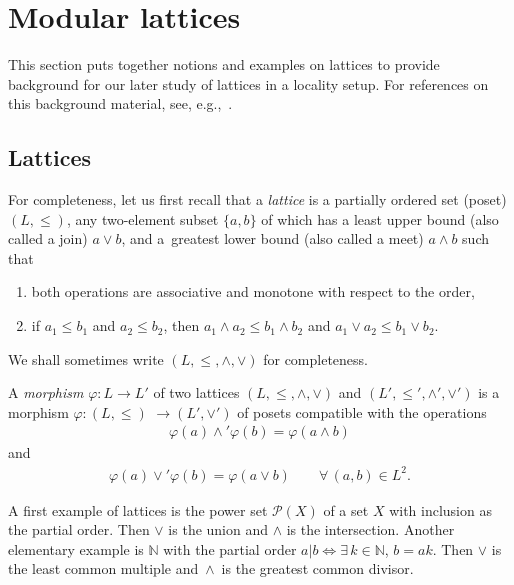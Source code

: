 \documentclass[pdftex]{sigma}
\numberwithin{equation}{section}
\newcommand{\N}{\mathbb{N}}
\begin{document}
\section {Modular lattices} \label{section:lattices}
{\samepage
This section puts together notions and examples on lattices to provide background
for our later study of lattices in a locality setup. For references on this background material, see, e.g.,~\cite{B,FF, Gra2,Gra1,HP,K,ML,MM,PR}.

}

\subsection{Lattices}
For completeness, let us first recall that a {\it lattice} is a partially ordered set (poset) $(L,\leq)$, any two-element subset $ \{a, b\}$ of which has a
least upper bound (also called a join) $a\vee b$, and a~greatest lower bound (also called a meet) $a\wedge b$ such that
\begin{enumerate}\itemsep=0pt
\item[$(a)$] both operations are associative and monotone with respect to the order,
\item[$(b)$] if $a_1\leq b_1$ and $a_2\leq b_2$, then $a_1\wedge a_2\leq b_1\wedge b_2$ and $a_1\vee a_2\leq b_1\vee b_2$.
\end{enumerate}
We shall sometimes write $(L,\leq,\wedge, \vee)$ for completeness.

A {\it morphism} $\varphi\colon L\to L'$ of two lattices $(L,\leq,\wedge, \vee)$ and $(L',\leq',\wedge', \vee')$ is a morphism $\varphi\colon (L,\leq )$ $\to (L', \vee')$ of posets compatible with the operations
\begin{gather*}
\varphi(a)\wedge'\varphi(b)= \varphi(a\wedge b)
\end{gather*}
and
\begin{gather*}
\varphi(a)\vee'\varphi(b)= \varphi(a\vee b) \qquad \forall\, (a, b)\in L^2.
\end{gather*}

\begin{Example} \label{ex:powerset} %
A first example of lattices is the power set ${\mathcal P}(X)$ of a set $X$ with inclusion as the partial order. Then $\vee$ is the union and $\wedge$ is the intersection. Another elementary example is $\N$ with the partial order $a\vert b\Longleftrightarrow \exists\, k\in \N$, $b=a k$. Then $\vee$ is the least common multiple and~$\wedge$~is the greatest common divisor.
\end{Example}
\end{document}
